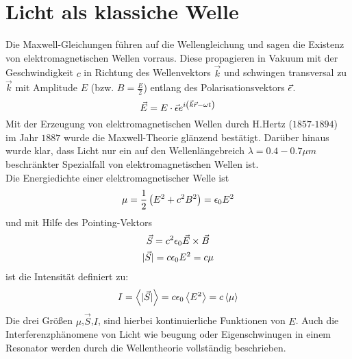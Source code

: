\section{Licht als klassiche Welle} %
\label{sec:Licht_als_klassiche_Welle}
Die Maxwell-Gleichungen führen auf die Wellengleichung und sagen die Existenz
von elektromagnetischen Wellen vorraus. Diese propagieren in Vakuum mit der
Geschwindigkeit $c$ in Richtung des Wellenvektors $\vec{k}$ und schwingen
transversal zu $\vec{k}$ mit Amplitude $E$ (bzw. $B= \frac{E}{2}$) entlang des
Polarisationsvektors $\vec{\epsilon}$.
\begin{equation*}
    \vec{E} = E \cdot \vec{\epsilon} e^{i \left( \vec{k} \vec{r} - \omega t \right) }
\end{equation*}
Mit der Erzeugung von elektromagnetischen Wellen durch H.Hertz ($1857$-$1894$)
im Jahr $1887$ wurde die Maxwell-Theorie glänzend bestätigt. Darüber hinaus
wurde klar, dass Licht nur ein auf den Wellenlängebreich $\lambda = 0.4 - 0.7
\mu m$ beschränkter Spezialfall von elektromagnetischen Wellen ist.
\\
Die Energiedichte einer elektromagnetischer Welle ist
\begin{equation*}
    \mu = \frac{1}{2} \left( E^2 + c^2 B^2 \right)  = \epsilon_0 E^2
\end{equation*}
und mit Hilfe des Pointing-Vektors
\begin{gather*}
    \vec{S} = c^2 \epsilon_0 \vec{E} \times \vec{B} \\
    \lvert \vec{S} \rvert = c \epsilon_0 E^2 = c \mu
\end{gather*}
ist die Intensität definiert zu:
\begin{equation*}
    I = \left\langle \lvert \vec{S} \rvert \right\rangle
    = c \epsilon_0 \left\langle E^2 \right\rangle
    = c \left\langle \mu \right\rangle
\end{equation*}
Die drei Größen $\mu$,$\vec{S}$,$I$, sind hierbei kontinuierliche Funktionen von
$E$. Auch die Interferenzphänomene von Licht wie beugung oder Eigenschwinugen
in einem Resonator werden durch die Wellentheorie vollständig beschrieben.

